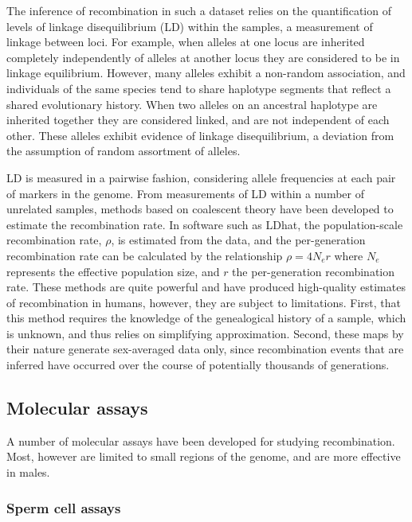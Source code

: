 The inference of recombination in such a dataset relies on the quantification of levels of linkage disequilibrium (LD) within the samples, a measurement of linkage between loci.
For example, when alleles at one locus are inherited completely independently of alleles at another locus they are considered to be in linkage equilibrium.
However, many alleles exhibit a non-random association, and individuals of the same species tend to share haplotype segments that reflect a shared evolutionary history.
When two alleles on an ancestral haplotype are inherited together they are considered linked, and are not independent of each other.
These alleles exhibit evidence of linkage disequilibrium, a deviation from the assumption of random assortment of alleles.

LD is measured in a pairwise fashion, considering allele frequencies at each pair of markers in the genome.
From measurements of LD within a number of unrelated samples, methods based on coalescent theory have been developed to estimate the recombination rate\cite{Auton2012}.
In software such as LDhat\cite{Mcvean2004,Auton2007,Auton2014}, the population-scale recombination rate, $\rho$, is estimated from the data, and the per-generation recombination rate can be calculated by the relationship
$\rho = 4 N_e r$
where $N_e$ represents the effective population size, and $r$ the per-generation recombination rate.
These methods are quite powerful and have produced high-quality estimates of recombination in humans\cite{hapmap2007}, however, they are subject to limitations.
First, that this method requires the knowledge of the genealogical history of a sample, which is unknown, and thus relies on simplifying approximation.
Second, these maps by their nature generate sex-averaged data only, since recombination events that are inferred have occurred over the course of potentially thousands of generations.


\subsection{Molecular assays}

A number of molecular assays have been developed for studying recombination.
Most, however are limited to small regions of the genome, and are more effective in males.

\subsubsection{Sperm cell assays}

